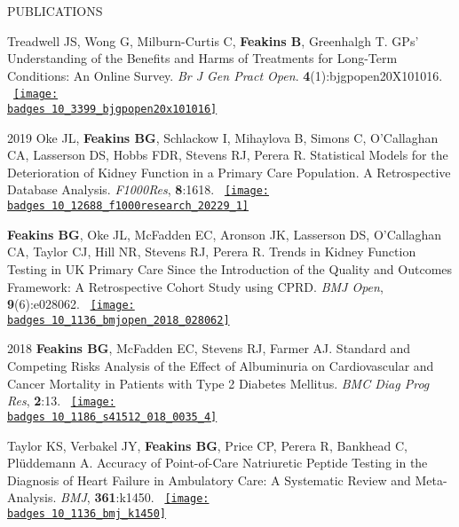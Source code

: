 \documentclass[10pt,a4paper]{article}
\def\badges{./badges/}
\begin{document}
\begin{cvlist}{PUBLICATIONS}
	\item[]
	Treadwell JS, Wong G, Milburn-Curtis C, \textbf{Feakins B}, Greenhalgh T. GPs' Understanding of the Benefits and Harms of Treatments for Long-Term Conditions: An Online Survey. \textit{Br J Gen Pract Open}. \textbf{4}(1):bjgpopen20X101016. ~\href{https://www.altmetric.com/details/77018222}{\texttt{[image: \\badges 10\_3399\_bjgpopen20x101016]}}
	
	\item[2019]
	Oke JL, \textbf{Feakins BG}, Schlackow I, Mihaylova B, Simons C, O'Callaghan CA, Lasserson DS, Hobbs FDR, Stevens RJ, Perera R. Statistical Models for the Deterioration of Kidney Function in a Primary Care Population. A Retrospective Database Analysis. \textit{F1000Res}, \textbf{8}:1618. ~\href{https://f1000research.altmetric.com/details/66389361}{\texttt{[image: \\badges 10\_12688\_f1000research\_20229\_1]}}
	
	\item[]
	\textbf{Feakins BG}, Oke JL, McFadden EC, Aronson JK, Lasserson DS, O'Callaghan CA, Taylor CJ, Hill NR, Stevens RJ, Perera R. Trends in Kidney Function Testing in UK Primary Care Since the Introduction of the Quality and Outcomes Framework: A Retrospective Cohort Study using CPRD. \textit{BMJ Open}, \textbf{9}(6):e028062. ~\href{https://bmj.altmetric.com/details/62023045}{\texttt{[image: \\badges 10\_1136\_bmjopen\_2018\_028062]}}
	
	\item[2018]
	\textbf{Feakins BG}, McFadden EC, Stevens RJ, Farmer AJ. Standard and Competing Risks Analysis of the Effect of Albuminuria on Cardiovascular and Cancer Mortality in Patients with Type 2 Diabetes Mellitus. \textit{BMC Diag Prog Res}, \textbf{2}:13. ~\href{https://biomedcentral.altmetric.com/details/45475518}{\texttt{[image: \\badges 10\_1186\_s41512\_018\_0035\_4]}}
	
	\item[]
	Taylor KS, Verbakel JY, \textbf{Feakins BG}, Price CP, Perera R, Bankhead C, Pl\"uddemann A. Accuracy of Point-of-Care Natriuretic Peptide Testing in the Diagnosis of Heart Failure in Ambulatory Care: A Systematic Review and Meta-Analysis. \textit{BMJ}, \textbf{361}:k1450. ~\href{https://bmj.altmetric.com/details/42193657}{\texttt{[image: \\badges 10\_1136\_bmj\_k1450]}}
	

\end{cvlist}
\end{document}
